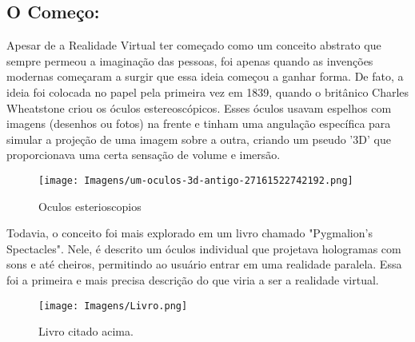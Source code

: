 \documentclass[article,a4paper,12pt,brazil,sumario=tradicional]{abntex2}
\begin{document}
    \subsection{O Começo:}
        Apesar de a Realidade Virtual ter começado como um conceito abstrato que sempre permeou a imaginação das pessoas, foi apenas quando as invenções modernas começaram a surgir que essa ideia começou a ganhar forma. De fato, a ideia foi colocada no papel pela primeira vez em 1839, quando o britânico Charles Wheatstone criou os óculos estereoscópicos. Esses óculos usavam espelhos com imagens (desenhos ou fotos) na frente e tinham uma angulação específica para simular a projeção de uma imagem sobre a outra, criando um pseudo '3D' que proporcionava uma certa sensação de volume e imersão.
        \begin{figure}[H]
            \centering
            \texttt{[image: Imagens/um-oculos-3d-antigo-27161522742192.png]}
            \caption{Oculos esterioscopios}
            \label{fig:enter-label}
        \end{figure}
        Todavia, o conceito foi mais explorado em um livro chamado "Pygmalion's Spectacles". Nele, é descrito um óculos individual que projetava hologramas com sons e até cheiros, permitindo ao usuário entrar em uma realidade paralela. Essa foi a primeira e mais precisa descrição do que viria a ser a realidade virtual.
        \begin{figure}[H]
            \centering
            \texttt{[image: Imagens/Livro.png]}
            \caption{Livro citado acima.}
            \label{fig:enter-label}
        \end{figure}
\end{document}
